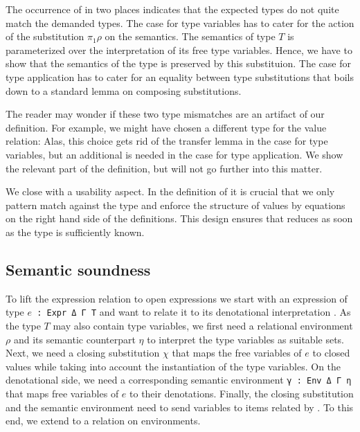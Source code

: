 \documentclass[acmsmall,anonymous,review,screen]{acmart}
\begin{document}
The occurrence of {\Asubst} in two places indicates that the expected types do not quite
match the demanded types.
The case for type variables has to cater for the action of the
substitution $\pi_1\rho$ on the semantics. The semantics of type $T$
is parameterized over the interpretation of its free type
variables. Hence, we have to show that the semantics of the type is
preserved by this substituion.
\TFsubstVarPreservesType
The case for type application has to cater for an equality between
type substitutions that boils down to a standard lemma on composing
substitutions.
\LogicallemmaOne

The reader may wonder if these two type mismatches are an
artifact of our definition. For example, we might have chosen a
different type for the value relation:
\LogicalVariationMCVType
Alas, this choice gets rid of the transfer lemma in the case for type
variables, but an additional {\Asubst} is needed in the case for type
application. We show the relevant part of the definition, but will not go further into this matter.
\LogicalVariationMCVBodyUniversal

We close with a usability aspect.
In the definition of {\AVSem} it is crucial that we only pattern match
against the type and enforce the structure of values by equations on
the right hand side of the definitions. This design ensures that {\AVSem}
reduces as soon as the type is sufficiently known.

\subsection{Semantic soundness}
\label{sec:relat-open-expr}

To lift the expression relation {\AESem} to open expressions we start
with an expression of type \texttt{$e$ : Expr Δ Γ T} and want to relate it
to its denotational interpretation . As the type $T$
may also contain type variables, we first need a relational
environment $\rho$ and its semantic counterpart $\eta$ to interpret
the type variables as suitable sets.
Next, we need a closing substitution $\chi$ that maps the free
variables of $e$ to closed values while taking into account the
instantiation of the type variables. On the denotational side, we need
a corresponding semantic environment \texttt{γ : Env Δ Γ η} that maps
free variables of $e$ to their denotations. Finally, the closing
substitution and the semantic environment need to send variables to
items related by {\AVSem}. To this end, we extend {\AVSem} to a
relation {\AGSem} on environments.
\end{document}
